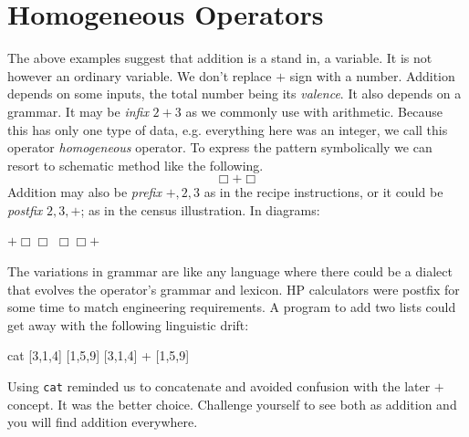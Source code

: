 \section{Homogeneous Operators}
The above examples suggest that addition is a stand in, a variable.  It is not however 
an ordinary variable.  We don't replace $+$ sign with a number.  
Addition depends on some inputs, the total 
number being its \emph{valence}.    It also depends on a grammar.
It may be \emph{infix} $2+3$ as we commonly 
use with arithmetic.
Because this has only one type of data, e.g. everything here was an integer, 
 we call this operator \emph{homogeneous} operator.
To express the pattern symbolically we can resort 
to schematic method like the following.
\[
    \Box+\Box
\]
Addition may also be \emph{prefix} $+,2,3$ as in the recipe instructions,
or it could be \emph{postfix} $2,3,+$; as in the census illustration. 
In diagrams:
\begin{center}
$+ \Box \Box$
\hspace{1in}
$\Box \Box +$
\end{center}    

The variations in grammar are like any language 
where there could be a dialect that evolves the operator's grammar and lexicon.
 HP calculators were postfix for some time to match engineering requirements.
A program to add two lists could get away with the following linguistic drift:
\begin{center}
\begin{notebookin}
cat [3,1,4] [1,5,9]
[3,1,4] + [1,5,9]
\end{notebookin}
\begin{notebookout}[2]
[3,1,4,1,5,9]
[4,6,13]
\end{notebookout}
\end{center}
Using \texttt{cat} reminded us to concatenate and avoided confusion with the
later $+$ concept.  It was the better choice. Challenge yourself to see both as
addition and you will find addition everywhere. 


